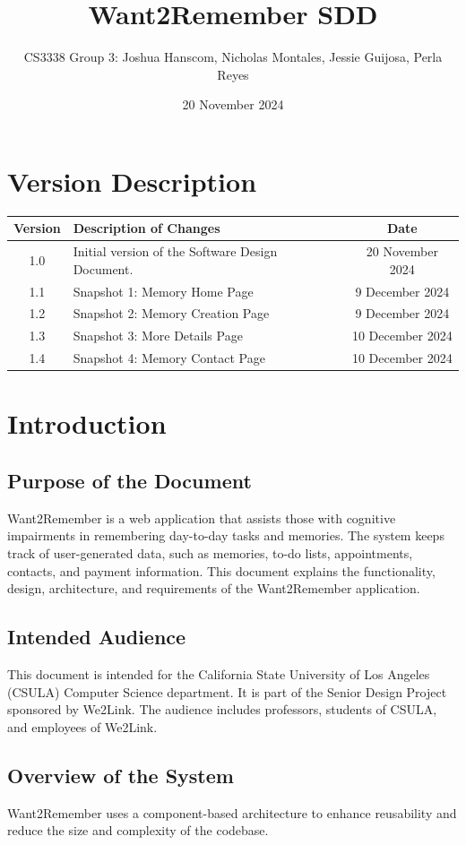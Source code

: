 \documentclass{article}
\title{Want2Remember SDD}
\author{CS3338 Group 3: Joshua Hanscom, Nicholas Montales, Jessie Guijosa, Perla Reyes}
\date{20 November 2024}
\begin{document}
\maketitle
\newpage
\tableofcontents
\newpage

\section*{Version Description}
\begin{tabular}{|c|p{10cm}|c|}
\hline
\textbf{Version} & \textbf{Description of Changes} & \textbf{Date} \\ \hline
1.0 & Initial version of the Software Design Document. & 20 November 2024 \\ \hline
1.1 & Snapshot 1: Memory Home Page & 9 December 2024 \\ \hline
1.2 & Snapshot 2: Memory Creation Page & 9 December 2024 \\ \hline
1.3 & Snapshot 3: More Details Page & 10 December 2024 \\ \hline
1.4 & Snapshot 4: Memory Contact Page & 10 December 2024 \\ \hline
\end{tabular}
\newpage

\section{Introduction}
\subsection{Purpose of the Document}
Want2Remember is a web application that assists those with cognitive impairments in remembering day-to-day tasks and memories. The system keeps track of user-generated data, such as memories, to-do lists, appointments, contacts, and payment information. This document explains the functionality, design, architecture, and requirements of the Want2Remember application.

\subsection{Intended Audience}
This document is intended for the California State University of Los Angeles (CSULA) Computer Science department. It is part of the Senior Design Project sponsored by We2Link. The audience includes professors, students of CSULA, and employees of We2Link.

\subsection{Overview of the System}
Want2Remember uses a component-based architecture to enhance reusability and reduce the size and complexity of the codebase.
\end{document}
